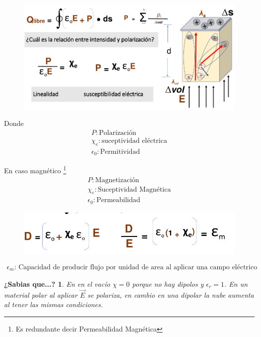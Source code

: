 \documentclass[12pt,letterpaper]{book}
\newtheorem{sabias}{¿Sabias que...?}[section]
\begin{document}
\begin{figure}[H]
\centering
\includegraphics[width=1\linewidth]{figures/carFre4.png}
\caption{}
\label{carFre4}
\end{figure}
\vspace{0.2cm}

Donde
\begin{align*}
P: \text{Polarización}\\
\chi _e: \text{suceptividad eléctrica}\\
\epsilon _0: \text{Permitividad}
\end{align*}

En caso magnético \footnote{Es redundante decir Permeabilidad Magnética}
\begin{align*}
P: \text{Magnetización} \\
\chi _e: \text{Suceptividad Magnética}\\
\epsilon _0: \text{Permeabilidad } 
\end{align*}


\begin{figure}[H]
\centering
\includegraphics[width=1\linewidth]{figures/carFre5.png}
\caption{}
\label{carFre5}
\end{figure}
\vspace{0.2cm}

\begin{align*}
\epsilon _m \text{: Capacidad de producir flujo por unidad de area al aplicar una campo eléctrico}
\end{align*}

\begin{sabias}
En en el vacío $\chi =0$ porque no hay dipolos y $\epsilon _r=1$. En un material polar al aplicar $\vec{E}$ se polariza, en cambio en una dipolar  la nube aumenta al tener las mismas condiciones. 
\end{sabias}
\end{document}
